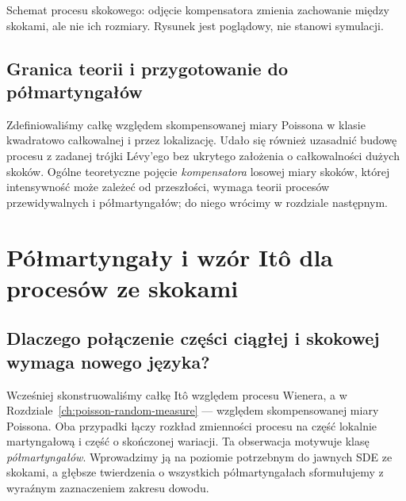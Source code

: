 \documentclass[11pt,a4paper,oneside]{report}
\numberwithin{equation}{chapter}
\theoremstyle{plain}
\theoremstyle{definition}
\theoremstyle{remark}
\begin{document}
\begin{center}
\par\smallskip\small Schemat procesu skokowego: odjęcie kompensatora
zmienia zachowanie między skokami, ale nie ich rozmiary.
Rysunek jest poglądowy, nie stanowi symulacji.
\end{center}

\section{Granica teorii i przygotowanie do półmartyngałów}
Zdefiniowaliśmy całkę względem skompensowanej miary
Poissona w klasie kwadratowo całkowalnej i przez lokalizację.
Udało się również uzasadnić budowę procesu z zadanej trójki
Lévy'ego bez ukrytego założenia o całkowalności dużych
skoków. Ogólne teoretyczne pojęcie \emph{kompensatora}
losowej miary skoków, której intensywność może zależeć
od przeszłości, wymaga teorii procesów przewidywalnych
i półmartyngałów; do niego wrócimy w rozdziale następnym.

\chapter{Półmartyngały i wzór Itô dla procesów ze skokami}
\label{ch:semimartingale-jumps}

\section{Dlaczego połączenie części ciągłej i skokowej wymaga nowego języka?}

Wcześniej skonstruowaliśmy całkę Itô względem procesu Wienera,
a w Rozdziale~\ref{ch:poisson-random-measure} --- względem
skompensowanej miary Poissona. Oba przypadki łączy rozkład
zmienności procesu na część lokalnie martyngałową i część o
skończonej wariacji. Ta obserwacja motywuje klasę
\emph{półmartyngałów}. Wprowadzimy ją na poziomie potrzebnym do
jawnych SDE ze skokami, a głębsze twierdzenia o wszystkich
półmartyngałach sformułujemy z wyraźnym zaznaczeniem zakresu dowodu.
\end{document}
